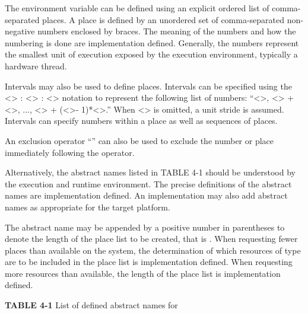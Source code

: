 The  environment variable can be defined using an explicit ordered list of 
comma-separated places. A place is defined by an unordered set of comma-separated 
non-negative numbers enclosed by braces. The meaning of the numbers and how the 
numbering is done are implementation defined. Generally, the numbers represent the 
smallest unit of execution exposed by the execution environment, typically a hardware 
thread.

Intervals may also be used to define places. Intervals can be specified using the 
<> : <> : <> notation to represent the following list of numbers: 
``<>, <> + <>, ..., <> + (<>-
1)*<>.'' When <> is omitted, a unit stride is assumed. Intervals can specify 
numbers within a place as well as sequences of places.

An exclusion operator ``\code{!}'' can also be used to exclude the number or place immediately 
following the operator.

Alternatively, the abstract names listed in TABLE 4-1 should be understood by the 
execution and runtime environment. The precise definitions of the abstract names are 
implementation defined. An implementation may also add abstract names as appropriate 
for the target platform.

The abstract name may be appended by a positive number in parentheses to denote the 
length of the place list to be created, that is . When 
requesting fewer places than available on the system, the determination of which 
resources of type  are to be included in the place list is implementation 
defined. When requesting more resources than available, the length of the place list is 
implementation defined.


\medskip
\textsf{\textbf{\footnotesize{TABLE 4-1}}}\hspace{1em} List of defined abstract names for 


